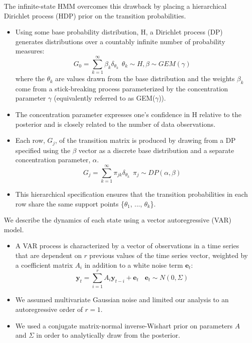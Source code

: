 \documentclass{article}
\begin{document}
  The infinite-state HMM overcomes this drawback by placing a hierarchical
  Dirichlet process (HDP) prior on the transition probabilities.
  \begin{itemize}
    \item Using some base probability distribution, H, a Dirichlet process 
    (DP) generates distributions over a countably infinite number of 
    probability measures:
    \begin{equation}
      G_0 = \sum_{k=1}^{\infty} \beta_k \delta_{\theta_k} ~~ \theta_k \sim H, \beta \sim GEM(\gamma)
    \end{equation}
    where the $\theta_k$ are values drawn from the base distribution and the
    weights $\beta_k$ come from a stick-breaking process parameterized by the concentration 
    parameter $\gamma$ (equivalently referred to as GEM($\gamma$)). 
    \item The concentration parameter expresses one's confidence in H relative to the posterior 
    and is closely related to the number of data observations.
    \item Each row, $G_j$, of the transition matrix is produced by drawing from a DP specified 
    using the $\beta$ vector as a discrete base distribution and a separate concentration
    parameter, $\alpha$.
    \begin{equation}
      G_j = \sum_{k=1}^{\infty} \pi_{jk} \delta_{\theta_k} ~~ \pi_j \sim DP(\alpha, \beta)
    \end{equation}
    \item This hierarchical specification ensures that the transition probabilities in 
    each row share the same support points \{$\theta_1$, ..., $\theta_k$\}.
  \end{itemize}
   
  \noindent We describe the dynamics of each state using a vector autoregressive (VAR) model. 
  \begin{itemize}
  	\item A VAR process is characterized by a vector of observations in a time series 
  	that are dependent on $r$ previous values of the time series vector, weighted by a
  	coefficient matrix $A_i$ in addition to a white noise term $\mathbf{e}_t$:
  	\begin{equation}
  	\mathbf{y}_t = \sum_{i=1}^r A_i\mathbf{y}_{t-i} + \mathbf{e}_t~~~~\mathbf{e}_t \sim N(0, \Sigma)
  	\end{equation}
  	\item We assumed multivariate Gaussian noise and limited our analysis to an 
  	autoregressive order of $r=1$.
  	\item We used a conjugate matrix-normal inverse-Wishart prior on parameters
  	$A$ and $\Sigma$ in order to analytically draw from the posterior.
  \end{itemize}   
  
\end{document}
